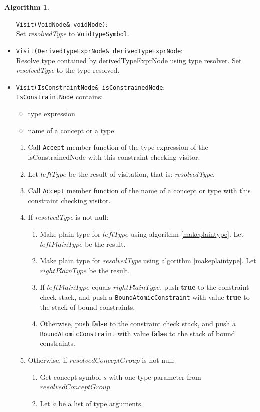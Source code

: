 \documentclass[a4paper,oneside,11pt]{book}
\theoremstyle{definition}
\newtheorem{algo}{Algorithm}[section]
\begin{document}
\begin{algo}
\begin{itemize}
\verb|Visit(VoidNode& voidNode)|:\\
Set \emph{resolvedType} to \verb|VoidTypeSymbol|.
\item
\verb|Visit(DerivedTypeExprNode& derivedTypeExprNode|:\\
Resolve type contained by derivedTypeExprNode using type resolver.
Set \emph{resolvedType} to the type resolved.
\item
\verb|Visit(IsConstraintNode& isConstrainedNode|:\\
\verb|IsConstraintNode| contains:
\begin{itemize}
\item
type expression
\item
name of a concept or a type
\end{itemize}
\begin{enumerate}
\item
Call \verb|Accept| member function of the type expression of the isConstrainedNode with this constraint checking visitor.
\item
Let $leftType$ be the result of visitation, that is: \emph{resolvedType}.
\item
Call \verb|Accept| member function of the name of a concept or type with this constraint checking visitor.
\item
If \emph{resolvedType} is not null:
\begin{enumerate}
\item
Make plain type for $leftType$ using algorithm \ref{makeplaintype}. Let $leftPlainType$ be the result.
\item
Make plain type for \emph{resolvedType} using algorithm \ref{makeplaintype}. Let $rightPlainType$ be the result.
\item
If $leftPlainType$ equals $rightPlainType$, push \textbf{true} to the constraint check stack,
and push a \verb|BoundAtomicConstraint| with value \textbf{true} to the stack of bound constraints.
\item
Otherwise, push \textbf{false} to the constraint check stack,
and push a \verb|BoundAtomicConstraint| with value \textbf{false} to the stack of bound constraints.
\end{enumerate}
\item
Otherwise, if $resolvedConceptGroup$ is not null:
\begin{enumerate}
\item
Get concept symbol $s$ with one type parameter from $resolvedConceptGroup$.
\item
Let $a$ be a list of type arguments.

\end{enumerate}
\end{enumerate}
\end{itemize}
\end{algo}
\end{document}
